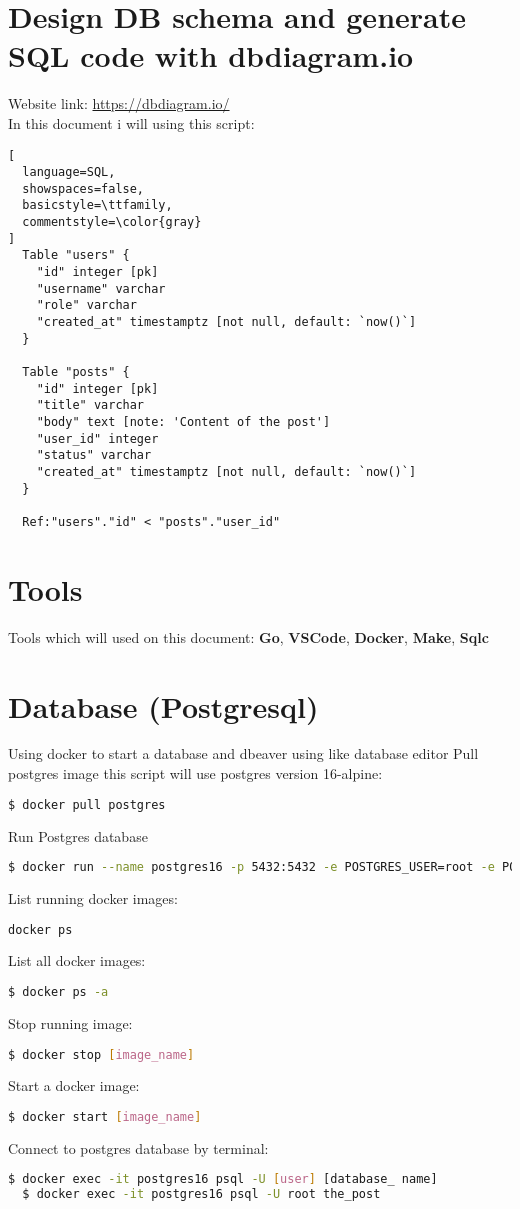 

\section{Design DB schema and generate SQL code with dbdiagram.io}
Website link: \url{https://dbdiagram.io/} \\
In this document i will using this script:
\begin{lstlisting}[
  language=SQL,
  showspaces=false,
  basicstyle=\ttfamily,
  commentstyle=\color{gray}
]
  Table "users" {
    "id" integer [pk]
    "username" varchar
    "role" varchar
    "created_at" timestamptz [not null, default: `now()`]
  }

  Table "posts" {
    "id" integer [pk]
    "title" varchar
    "body" text [note: 'Content of the post']
    "user_id" integer
    "status" varchar
    "created_at" timestamptz [not null, default: `now()`]
  }

  Ref:"users"."id" < "posts"."user_id"
\end{lstlisting}

\section{Tools}
Tools which will used on this document: \textbf{Go}, \textbf{VSCode}, \textbf{Docker}, \textbf{Make}, \textbf{Sqlc}


\section{Database (Postgresql)}
Using docker to start a database and dbeaver using like database editor
Pull postgres image this script will use postgres version 16-alpine:
\begin{lstlisting}[language=bash]
  $ docker pull postgres
\end{lstlisting}
Run Postgres database
\begin{lstlisting}[language=bash]
  $ docker run --name postgres16 -p 5432:5432 -e POSTGRES_USER=root -e POSTGRES_PASSWORD=secret -d postgres:16-alpine
\end{lstlisting}
List running docker images:
\begin{lstlisting}[language=bash]
  docker ps
\end{lstlisting}
List all docker images:
\begin{lstlisting}[language=bash]
  $ docker ps -a  
\end{lstlisting}
Stop running image:
\begin{lstlisting}[language=bash]
  $ docker stop [image_name]
\end{lstlisting}
Start a docker image:
\begin{lstlisting}[language=bash]
  $ docker start [image_name]
\end{lstlisting}
Connect to postgres database by terminal:
\begin{lstlisting}[language=bash]
  $ docker exec -it postgres16 psql -U [user] [database_ name]
  $ docker exec -it postgres16 psql -U root the_post
\end{lstlisting}



